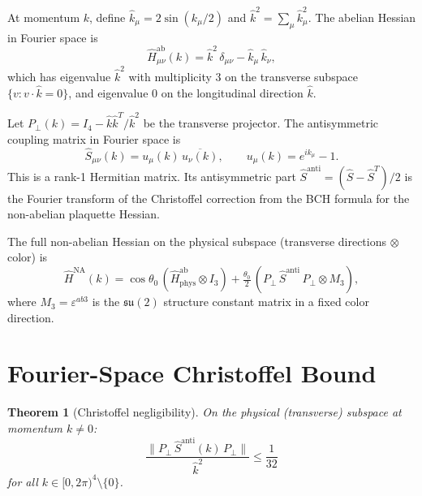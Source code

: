 \documentclass[11pt,a4paper]{article}
\theoremstyle{plain}
\newtheorem{theorem}{Theorem}[section]
\theoremstyle{definition}
\theoremstyle{remark}
\newcommand{\su}{\mathfrak{su}}
\newcommand{\khat}{\hat{k}}
\begin{document}
At momentum $k$, define $\khat_\mu = 2\sin(k_\mu/2)$ and
$\khat^2 = \sum_\mu \khat_\mu^2$.
The abelian Hessian in Fourier space is
\begin{equation}\label{eq:H-ab-fourier}
  \hat{H}^{\mathrm{ab}}_{\mu\nu}(k)
  = \khat^2\,\delta_{\mu\nu} - \khat_\mu\,\khat_\nu,
\end{equation}
which has eigenvalue $\khat^2$ with multiplicity $3$ on the
transverse subspace $\{v : v \cdot \khat = 0\}$, and
eigenvalue $0$ on the longitudinal direction $\khat$.

Let $P_\perp(k) = I_4 - \khat \khat^T/\khat^2$ be the
transverse projector.
The antisymmetric coupling matrix in Fourier space is
\begin{equation}\label{eq:S-fourier}
  \hat{S}_{\mu\nu}(k) = u_\mu(k)\,\overline{u_\nu(k)},
  \qquad u_\mu(k) = e^{ik_\mu} - 1.
\end{equation}
This is a rank-1 Hermitian matrix.
Its antisymmetric part
$\hat{S}^{\mathrm{anti}} = (\hat{S} - \hat{S}^T)/2$
is the Fourier transform of the Christoffel correction from the
BCH formula for the non-abelian plaquette Hessian.

The full non-abelian Hessian on the physical subspace
(transverse directions $\otimes$ color) is
\begin{equation}\label{eq:H-NA-fourier}
  \hat{H}^{\mathrm{NA}}(k)
  = \cos\theta_0\,(\hat{H}^{\mathrm{ab}}_{\mathrm{phys}} \otimes I_3)
  + \tfrac{\theta_0}{2}\,
    (P_\perp\,\hat{S}^{\mathrm{anti}}\,P_\perp \otimes M_3),
\end{equation}
where $M_3 = \varepsilon^{ab3}$ is the $\su(2)$ structure constant
matrix in a fixed color direction.


\section{Fourier-Space Christoffel Bound}\label{sec:fourier}

\begin{theorem}[Christoffel negligibility]\label{thm:fourier-bound}
On the physical (transverse) subspace at momentum $k \neq 0$:
\begin{equation}\label{eq:christoffel-ratio}
  \frac{\|P_\perp\,\hat{S}^{\mathrm{anti}}(k)\,P_\perp\|}{\khat^2}
  \leq \frac{1}{32}
\end{equation}
for all $k \in [0, 2\pi)^4 \setminus \{0\}$.
\end{theorem}
\end{document}
